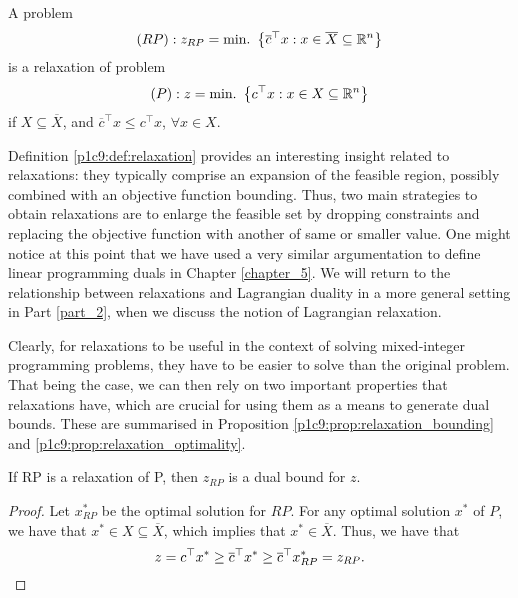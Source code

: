 \begin{definition}[Relaxation] \label{p1c9:def:relaxation}
	A problem 
	\begin{equation*}
	  (RP): z_{RP} = \mathop{\text{min.~}} \left\{ \overline{c}^\top x : x \in \overline{X} \subseteq \mathbb{R}^n \right \} 
	\end{equation*}
%
	is a relaxation of problem
	\begin{equation*}
	  (P): z = \mathop{\text{min.~}} \left\{ c^\top x : x \in X \subseteq \mathbb{R}^n \right \} 
	\end{equation*}
	if $X \subseteq \overline{X}$, and $\overline{c}^\top x \leq c^\top x$, $\forall x \in X$.
\end{definition}

Definition \ref{p1c9:def:relaxation} provides an interesting insight related to relaxations: they typically comprise an expansion of the feasible region, possibly combined with an objective function bounding. Thus, two main strategies to obtain relaxations are to enlarge the feasible set by dropping constraints and replacing the objective function with another of same or smaller value. One might notice at this point that we have used a very similar argumentation to define linear programming duals in Chapter \ref{chapter_5}. We will return to the relationship between relaxations and Lagrangian duality in a more general setting in Part \ref{part_2}, when we discuss the notion of Lagrangian relaxation.

Clearly, for relaxations to be useful in the context of solving mixed-integer programming problems, they have to be easier to solve than the original problem. That being the case, we can then rely on two important properties that relaxations have, which are crucial for using them as a means to generate dual bounds. These are summarised in Proposition \ref{p1c9:prop:relaxation_bounding} and \ref{p1c9:prop:relaxation_optimality}.

\begin{proposition} \label{p1c9:prop:relaxation_bounding}
	If RP is a relaxation of P, then $z_{RP}$ is a dual bound for $z$. 
\end{proposition}
    
\begin{proof} Let $x^*_{RP}$ be the optimal solution for $RP$. For any optimal solution $x^*$ of $P$, we have that $x^* \in X \subseteq \overline{X}$, which implies that $x^* \in \overline{X}$. Thus, we have that
  \begin{equation*}
  	 z = c^\top x^* \geq \overline{c}^\top x^* \geq \overline{c}^\top x^*_{RP} = z_{RP}.	\qedhere
  \end{equation*}
\end{proof}

